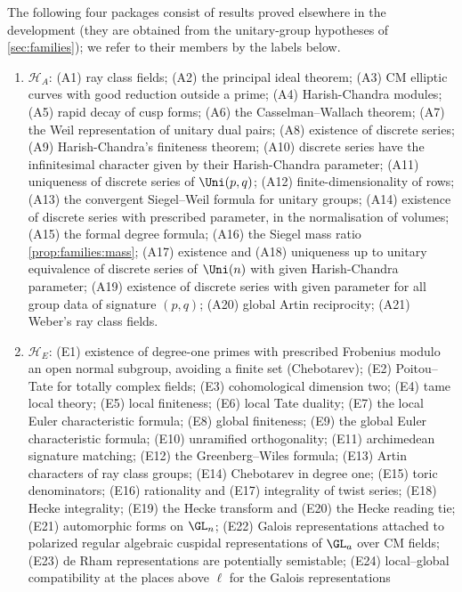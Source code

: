 \begin{definition}\label{pf:baselat1:def:packages}
The following four packages consist of results proved elsewhere in the development (they are obtained from
the unitary-group hypotheses of \cref{sec:families}); we refer to their members by the labels below.
\begin{enumerate}[label=(\alph*)]
\item $\mathcal H_A$: (A1) ray class fields; (A2) the principal ideal theorem; (A3) CM elliptic curves with good
  reduction outside a prime; (A4) Harish-Chandra modules; (A5) rapid decay of cusp forms; (A6) the
  Casselman--Wallach theorem; (A7) the Weil representation of unitary dual pairs; (A8) existence of discrete
  series; (A9) Harish-Chandra's finiteness theorem; (A10) discrete series have the infinitesimal character given
  by their Harish-Chandra parameter; (A11) uniqueness of discrete series of $\Uni(p,q)$; (A12)
  finite-dimensionality of rows; (A13) the convergent Siegel--Weil formula for unitary groups; (A14) existence
  of discrete series with prescribed parameter, in the normalisation of volumes; (A15) the formal degree formula;
  (A16) the Siegel mass ratio \cref{prop:families:mass}; (A17) existence and (A18) uniqueness up to unitary
  equivalence of discrete series of $\Uni(n)$ with given Harish-Chandra parameter; (A19) existence of discrete
  series with given parameter for all group data of signature $(p,q)$; (A20) global Artin reciprocity; (A21)
  Weber's ray class fields.
\item $\mathcal H_E$: (E1) existence of degree-one primes with prescribed Frobenius modulo an open normal
  subgroup, avoiding a finite set (Chebotarev); (E2) Poitou--Tate for totally complex fields; (E3)
  cohomological dimension two; (E4) tame local theory; (E5) local finiteness; (E6) local Tate duality; (E7) the
  local Euler characteristic formula; (E8) global finiteness; (E9) the global Euler characteristic formula; (E10)
  unramified orthogonality; (E11) archimedean signature matching; (E12) the Greenberg--Wiles formula; (E13) Artin
  characters of ray class groups; (E14) Chebotarev in degree one; (E15) toric denominators; (E16) rationality and
  (E17) integrality of twist series; (E18) Hecke integrality; (E19) the Hecke transform and (E20) the Hecke
  reading tie; (E21) automorphic forms on $\GL_n$; (E22) Galois representations attached to polarized regular
  algebraic cuspidal representations of $\GL_a$ over CM fields; (E23) de Rham representations are potentially
  semistable; (E24) local--global compatibility at the places above $\ell$ for the Galois representations

\end{enumerate}
\end{definition}

